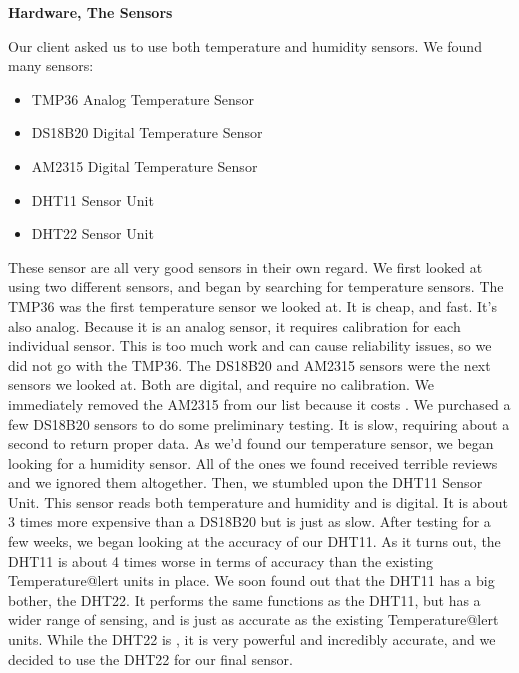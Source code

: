 \documentclass{report}
\begin{document}
\begin{center}
	\textbf{Hardware, The Sensors}
\end{center}
\indent
\indent
Our client asked us to use both temperature and humidity sensors. We found many sensors:
\begin{itemize}
	\item TMP36 Analog Temperature Sensor
	\item DS18B20 Digital Temperature Sensor
	\item AM2315 Digital Temperature Sensor
	\item DHT11 Sensor Unit
	\item DHT22 Sensor Unit
\end{itemize}
\indent
These sensor are all very good sensors in their own regard. We first looked at using two different sensors, and began by searching for temperature sensors.
\newline
\indent
The TMP36 was the first temperature sensor we looked at. It is cheap, and fast. It's also analog. Because it is an analog sensor, it requires calibration for each individual sensor. This is too much work and can cause reliability issues, so we did not go with the TMP36.
\newline
\indent
The DS18B20 and AM2315 sensors were the next sensors we looked at. Both are digital, and require no calibration. We immediately removed the AM2315 from our list because it costs . We purchased a few DS18B20 sensors to do some preliminary testing. It is slow, requiring about a second to return proper data.
\newline
\indent
As we'd found our temperature sensor, we began looking for a humidity sensor. All of the ones we found received terrible reviews and we ignored them altogether. Then, we stumbled upon the DHT11 Sensor Unit. This sensor reads both temperature and humidity and is digital. It is about 3 times more expensive than a DS18B20 but is just as slow.
\newline
\indent
After testing for a few weeks, we began looking at the accuracy of our DHT11. As it turns out, the DHT11 is about 4 times worse in terms of accuracy than the existing  Temperature@lert units in place. We soon found out that the DHT11 has a big bother, the DHT22. It performs the same functions as the DHT11, but has a wider range of sensing, and is just as accurate as the existing Temperature@lert units. While the DHT22 is , it is very powerful and incredibly accurate, and we decided to use the DHT22 for our final sensor.
\end{document}
